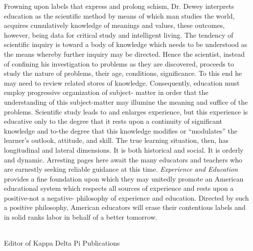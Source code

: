 Frowning upon labels that express and prolong schism, Dr. Dewey interprets 
education as the scientific method by means of which man studies the world, acquires 
cumulatively knowledge of meanings and values, these outcomes, however, being data 
for critical study and intelligent living. The tendency of scientific inquiry is toward a 
body of knowledge which needs to be understood as the means whereby further inquiry 
may be directed. Hence the scientist, instead of confining his investigation to problems as 
they are discovered, proceeds to study the nature of problems, their age, conditions, 
significance. To this end he may need to review related stores of knowledge. 
Consequently, education must employ progressive organization of subject- matter in 
order that the understanding of this subject-matter may illumine the meaning and suffice 
of the problems. Scientific study leads to and enlarges experience, but this experience is 
educative only to the degree that it rests upon a continuity of significant knowledge and 
to-the degree that this knowledge modifies or \enquote{modulates} the learner's outlook, attitude, 
and skill. The true learning situation, then, has longitudinal and lateral dimensions. It is 
both historical and social. It is orderly and dynamic. Arresting pages here await the many 
educators and teachers who are earnestly seeking reliable guidance at this time. 
\textit{Experience and Education} provides a fine foundation upon which they may unitedly 
promote an American educational system which respects all sources of experience and 
rests upon a positive-not a negative- philosophy of experience and education. Directed by 
such a positive philosophy, American educators will erase their contentious labels and in 
solid ranks labor in behalf of a better tomorrow. 

\noindent
{}\\
\noindent
Editor of Kappa Delta Pi Publications 
